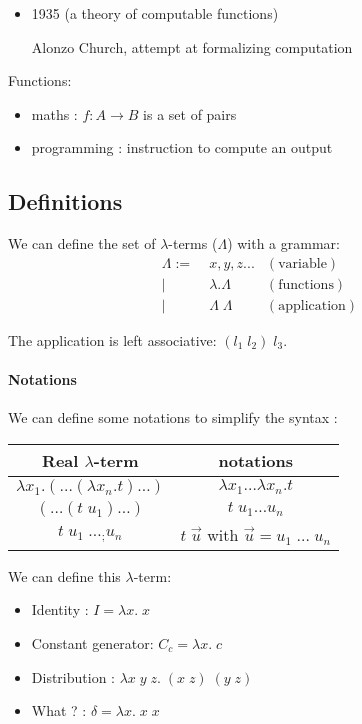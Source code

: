 \begin{itemize}
    \item 1935 (a theory of computable functions)

      Alonzo Church, attempt at formalizing computation
  \end{itemize}

  Functions:
  \begin{itemize}
    \item maths : $f : A \to B$ is a set of pairs
    \item programming : instruction to compute an output
  \end{itemize}

  \subsection{Definitions}

  We can define the set of $\lambda$-terms ($\Lambda$) with a grammar:
  \begin{align*}
    \Lambda :=&\; x, y, z ...         & (\text{variable}) \\
             |&\; \lambda. \Lambda    & (\text{functions}) \\
             |&\; \Lambda\; \Lambda   & (\text{application})
  \end{align*}

  The application is left associative: $(l_1\; l_2)\; l_3$.

  \paragraph{Notations} We can define some notations to simplify the syntax :

  \begin{center}
  \begin{tabular}{ c|c }
    Real $\lambda$-term & notations \\
    \hline
    $\lambda x_1.(\ldots(\lambda x_n. t)\ldots)$ & $\lambda x_1 \ldots
    \lambda x_n. t$ \\
    $(\ldots (t\; u_1)\ldots)$ & $t\;u_1 \ldots u_n$ \\
    $t\; u_1\; \ldots_; u_n$ & $t\; \vec{u}$ with $\vec u = u_1\; \ldots\; u_n$
  \end{tabular}
  \end{center}

  \exam We can define this $\lambda$-term:

  \begin{itemize}
    \item Identity : $I = \lambda x.\; x$
    \item Constant generator: $C_c = \lambda x.\; c$
    \item Distribution : $\lambda x\; y\; z.\; (x\;z)\; (y\;z)$
    \item What ? : $\delta = \lambda x.\;x\;x$
  \end{itemize}


